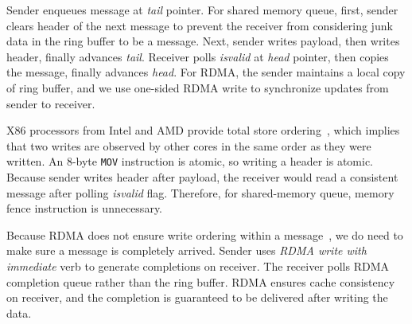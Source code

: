 Sender enqueues message at \textit{tail} pointer. For shared memory queue, first, sender clears header of the next message to prevent the receiver from considering junk data in the ring buffer to be a message. Next, sender writes payload, then writes header, finally advances \textit{tail}. Receiver polls \textit{isvalid} at \textit{head} pointer, then copies the message, finally advances \textit{head}.
For RDMA, the sender maintains a local copy of ring buffer, and we use one-sided RDMA write to synchronize updates from sender to receiver.


X86 processors from Intel and AMD provide total store ordering~\cite{sewell2010x86,intel-manual}, which implies that two writes are observed by other cores in the same order as they were written. An 8-byte \texttt{MOV} instruction is atomic, so writing a header is atomic. Because sender writes header after payload, the receiver would read a consistent message after polling \textit{isvalid} flag. Therefore, for shared-memory queue, memory fence instruction is unnecessary.

Because RDMA does not ensure write ordering within a message~\cite{infiniband2000infiniband}, we do need to make sure a message is completely arrived. Sender uses \textit{RDMA write with immediate} verb to generate completions on receiver. The receiver polls RDMA completion queue rather than the ring buffer. RDMA ensures cache consistency on receiver, and the completion is guaranteed to be delivered after writing the data.


